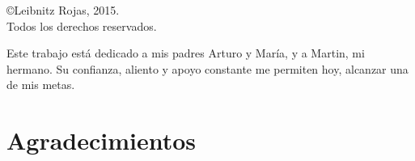 
\newpage
\vspace*{\fill}
\begin{center}
\copyright \hspace{0.2cm}Leibnitz Rojas, 2015.\\
Todos los derechos reservados.
\end{center}

\newpage
\clearpage
\vspace*{\fill}
\begin{flushright}
\begin{minipage}{.5\textwidth}
Este trabajo está dedicado a mis padres Arturo y María, y a Martin, mi hermano. Su confianza, aliento y apoyo constante me permiten hoy, alcanzar una de mis metas.\\
\end{minipage}
\end{flushright}
\vfill %
\newpage
\chapter*{Agradecimientos}

